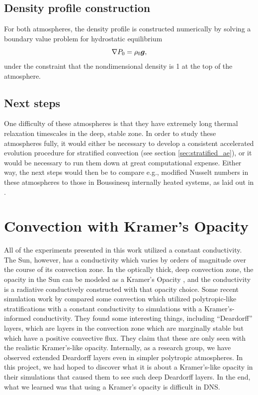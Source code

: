 \subsection{Density profile construction}
For both atmospheres, the density profile is constructed numerically by solving a boundary value problem for hydrostatic equilibrium
\begin{equation}
\nabla P_0 = \rho_0 \bm{g},
\end{equation}
under the constraint that the nondimensional density is 1 at the top of the atmosphere.

\subsection{Next steps}
One difficulty of these atmospheres is that they have extremely long thermal relaxation timescales in the deep, stable zone.
In order to study these atmospheres fully, it would either be necessary to develop a consistent accelerated evolution procedure for stratified convection (see section \ref{sec:stratified_ae}), or it would be necessary to run them down at great computational expense.
Either way, the next steps would then be to compare e.g., modified Nusselt numbers in these atmospheres to those in Boussinesq internally heated systems, as laid out in \citet{goluskin2016}.



\section{Convection with Kramer's Opacity}
\label{sec:kramers_opacity}
All of the experiments presented in this work utilized a constant conductivity.
The Sun, however, has a conductivity which varies by orders of magnitude over the course of its convection zone.
In the optically thick, deep convection zone, the opacity in the Sun can be modeled as a Kramer's Opacity \citep[see e.g.,][]{brandenburg2016}, and the conductivity is a radiative conductively constructed with that opacity choice.
Some recent simulation work by \citet{kapyla&all2017} compared some convection which utilized polytropic-like stratifications with a constant conductivity to simulations with a Kramer's-informed conductivity.
They found some interesting things, including ``Deardorff'' layers, which are layers in the convection zone which are marginally stable but which have a positive convective flux.
They claim that these are only seen with the realistic Kramer's-like opacity.
Internally, as a research group, we have observed extended Deardorff layers even in simpler polytropic atmospheres.
In this project, we had hoped to discover what it is about a Kramer's-like opacity in their simulations that caused them to see such deep Deardorff layers.
In the end, what we learned was that using a Kramer's opacity is difficult in DNS.

